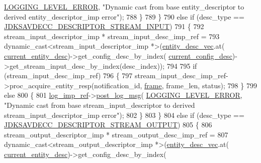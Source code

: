 \begin{DoxyCode}
      \hyperlink{namespaceavdecc__lib_a501055c431e6872ef46f252ad13f85cdaf2c4481208273451a6f5c7bb9770ec8a}{LOGGING\_LEVEL\_ERROR}, \textcolor{stringliteral}{"Dynamic cast from base entity\_descriptor to derived
       entity\_descriptor\_imp error"});
788             \}
789         \}
790         \textcolor{keywordflow}{else} \textcolor{keywordflow}{if} (desc\_type == \hyperlink{group__descriptor_ga4eb0b7597f11b5fc36f3625acd82e503}{JDKSAVDECC\_DESCRIPTOR\_STREAM\_INPUT})
791         \{
792             stream\_input\_descriptor\_imp * stream\_input\_desc\_imp\_ref =
793                 \textcolor{keyword}{dynamic\_cast<}stream\_input\_descriptor\_imp *\textcolor{keyword}{>}(\hyperlink{classavdecc__lib_1_1end__station__imp_a72edab41bc56e3c1757944a7df188a3d}{entity\_desc\_vec}.at(
      \hyperlink{classavdecc__lib_1_1end__station__imp_afd78c89df26ba7641e1adb764c0e827d}{current\_entity\_desc})->get\_config\_desc\_by\_index(
      \hyperlink{classavdecc__lib_1_1end__station__imp_a60b1af40d35e8a86b0082c54ab6cb6a8}{current\_config\_desc})->get\_stream\_input\_desc\_by\_index(desc\_index));
794 
795             \textcolor{keywordflow}{if} (stream\_input\_desc\_imp\_ref)
796             \{
797                 stream\_input\_desc\_imp\_ref->proc\_acquire\_entity\_resp(notification\_id, 
      \hyperlink{gst__avb__playbin_8c_ac8e710e0b5e994c0545d75d69868c6f0}{frame}, frame\_len, status);
798             \}
799             \textcolor{keywordflow}{else}
800             \{
801                 \hyperlink{namespaceavdecc__lib_acbe3e2a96ae6524943ca532c87a28529}{log\_imp\_ref}->\hyperlink{classavdecc__lib_1_1log_a68139a6297697e4ccebf36ccfd02e44a}{post\_log\_msg}(
      \hyperlink{namespaceavdecc__lib_a501055c431e6872ef46f252ad13f85cdaf2c4481208273451a6f5c7bb9770ec8a}{LOGGING\_LEVEL\_ERROR}, \textcolor{stringliteral}{"Dynamic cast from base stream\_input\_descriptor to derived
       stream\_input\_descriptor\_imp error"});
802             \}
803         \}
804         \textcolor{keywordflow}{else} \textcolor{keywordflow}{if} (desc\_type == \hyperlink{group__descriptor_gab458eb4963f42bfa5591d5dd604bedce}{JDKSAVDECC\_DESCRIPTOR\_STREAM\_OUTPUT})
805         \{
806             stream\_output\_descriptor\_imp * stream\_output\_desc\_imp\_ref =
807                 \textcolor{keyword}{dynamic\_cast<}stream\_output\_descriptor\_imp *\textcolor{keyword}{>}(\hyperlink{classavdecc__lib_1_1end__station__imp_a72edab41bc56e3c1757944a7df188a3d}{entity\_desc\_vec}.at(
      \hyperlink{classavdecc__lib_1_1end__station__imp_afd78c89df26ba7641e1adb764c0e827d}{current\_entity\_desc})->get\_config\_desc\_by\_index(

\end{DoxyCode}
